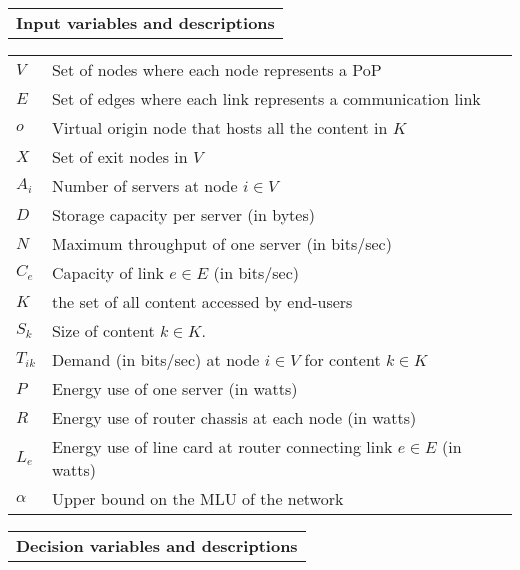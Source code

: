 \begin{table*}[t]
\centering
\begin{small}
\begin{tabular}{|p{6.15in}|} 
 \hline
\textbf{Input variables and descriptions}\\ 
\end{tabular}
\begin{tabular}{|p{1in}|p{5in}|}
\hline
  $V$ & Set of nodes where each node represents a PoP   \\
  $E$ & Set of edges where each link represents a communication link   \\
   $o$ & Virtual origin node that hosts all the content in $K$  \\ 
  $ X$ & Set of exit nodes in $V$ \\ 
  $A_i$ & Number of servers at node  $i \in V$ \\
  $D$ & Storage capacity per server  (in bytes) \\
  $N$ & Maximum  throughput of one server (in bits/sec) \\
  $C_e$ & Capacity of link $e \in E$ (in bits/sec)\\
  $K$ & the set of all content accessed by end-users \\
  $S_k$ & Size of content $k \in K$.   \\
  $T_{ik}$ & Demand (in bits/sec)  at  node $i \in V$ for content $k \in K$ \\
  $P$ & Energy use of one server (in watts)\\
$R$ & Energy use of router chassis at each node (in watts)\\
$L_e$ & Energy use of line card at router connecting link $e \in E$ (in watts)\\
 $\alpha$ & Upper bound on the MLU of the network \\
   \hline
   \end{tabular}
\begin{tabular}{|p{6.15in}|}
  \hline
\textbf{Decision variables and descriptions}\\ 

\end{tabular}
\end{small}
\end{table*}
